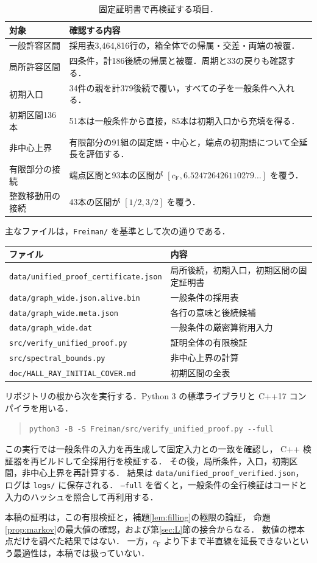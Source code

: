 \documentclass[11pt,a4paper]{article}
\theoremstyle{definition}
\newcommand{\CF}{c_{\mathrm F}}
\newcommand{\file}[1]{{\small\nolinkurl{#1}}}
\begin{document}
\begin{table}[htbp]
\centering\small
\begin{tabular}{p{}p{}}
\toprule
対象 & 確認する内容\\
\midrule
一般許容区間 & 採用表3,464,816行の，箱全体での帰属・交差・両端の被覆．\\
局所許容区間 & 四条件，計186後続の帰属と被覆．周期と33の戻りも確認する．\\
初期入口 & 34件の親を計379後続で覆い，すべての子を一般条件へ入れる．\\
初期区間136本 & 51本は一般条件から直接，85本は初期入口から充填を得る．\\
非中心上界 & 有限部分の91組の固定語・中心と，端点の初期語について全延長を評価する．\\
有限部分の接続 & 端点区間と93本の区間が $[\CF,6.524726426110279\ldots]$ を覆う．\\
整数移動用の接続 & 43本の区間が $[1/2,3/2]$ を覆う．\\
\bottomrule
\end{tabular}
\caption{固定証明書で再検証する項目．}\label{tab:verification}
\end{table}

主なファイルは，\file{Freiman/} を基準として次の通りである．
\begin{center}\small
\begin{tabular}{p{}p{}}
\toprule
ファイル & 内容\\
\midrule
\file{data/unified_proof_certificate.json} & 局所後続，初期入口，初期区間の固定証明書\\
\file{data/graph_wide.json.alive.bin} & 一般条件の採用表\\
\file{data/graph_wide.meta.json} & 各行の意味と後続候補\\
\file{data/graph_wide.dat} & 一般条件の厳密算術用入力\\
\file{src/verify_unified_proof.py} & 証明全体の有限検証\\
\file{src/spectral_bounds.py} & 非中心上界の計算\\
\file{doc/HALL_RAY_INITIAL_COVER.md} & 初期区間の全表\\
\bottomrule
\end{tabular}
\end{center}

リポジトリの根から次を実行する．Python 3 の標準ライブラリと
C++17 コンパイラを用いる．
\begin{quote}\small
\verb|python3 -B -S Freiman/src/verify_unified_proof.py --full|
\end{quote}
この実行では一般条件の入力を再生成して固定入力との一致を確認し，
C++ 検証器を再ビルドして全採用行を検証する．
その後，局所条件，入口，初期区間，非中心上界を再計算する．
結果は \file{data/unified_proof_verified.json}，ログは \file{logs/} に保存される．
\texttt{--full} を省くと，一般条件の全行検証はコードと入力のハッシュを照合して再利用する．

本稿の証明は，この有限検証と，補題\ref{lem:filling}の極限の論証，
命題\ref{prop:markov}の最大値の確認，および第\ref{sec:L}節の接合からなる．
数値の標本点だけを調べた結果ではない．
一方，$\CF$ より下まで半直線を延長できないという最適性は，本稿では扱っていない．
\end{document}
